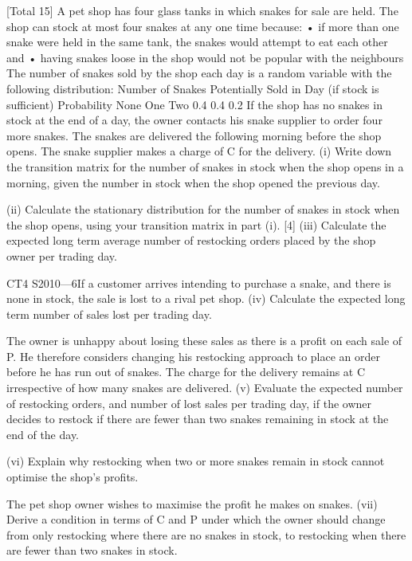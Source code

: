 \documentclass[a4paper,12pt]{article}
\begin{document}
\begin{enumerate}

[Total 15]
A pet shop has four glass tanks in which snakes for sale are held. The shop can stock
at most four snakes at any one time because:
• if more than one snake were held in the same tank, the snakes would attempt to
eat each other and
• having snakes loose in the shop would not be popular with the neighbours
The number of snakes sold by the shop each day is a random variable with the
following distribution:
Number of Snakes Potentially Sold
in Day (if stock is sufficient) Probability
None
One
Two 0.4
0.4
0.2
If the shop has no snakes in stock at the end of a day, the owner contacts his snake
supplier to order four more snakes. The snakes are delivered the following morning
before the shop opens. The snake supplier makes a charge of C for the delivery.
(i) Write down the transition matrix for the number of snakes in stock when the
shop opens in a morning, given the number in stock when the shop opened the
previous day.

(ii) Calculate the stationary distribution for the number of snakes in stock when
the shop opens, using your transition matrix in part (i).
[4]
(iii) Calculate the expected long term average number of restocking orders placed
by the shop owner per trading day.

CT4 S2010—6If a customer arrives intending to purchase a snake, and there is none in stock, the sale
is lost to a rival pet shop.
(iv)
Calculate the expected long term number of sales lost per trading day.

The owner is unhappy about losing these sales as there is a profit on each sale of P.
He therefore considers changing his restocking approach to place an order before he
has run out of snakes. The charge for the delivery remains at C irrespective of how
many snakes are delivered.
(v) Evaluate the expected number of restocking orders, and number of lost sales
per trading day, if the owner decides to restock if there are fewer than two
snakes remaining in stock at the end of the day.

(vi) Explain why restocking when two or more snakes remain in stock cannot
optimise the shop’s profits.

The pet shop owner wishes to maximise the profit he makes on snakes.
(vii)
Derive a condition in terms of C and P under which the owner should change
from only restocking where there are no snakes in stock, to restocking when
there are fewer than two snakes in stock.


\end{enumerate}
\end{document}
